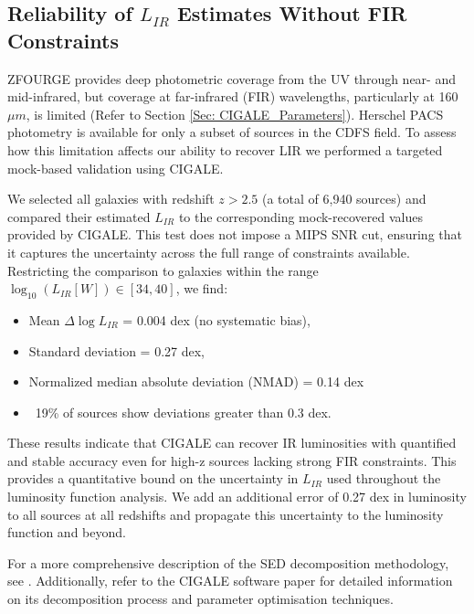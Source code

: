 \subsection{Reliability of $L_{IR}$ Estimates Without FIR Constraints} \label{Sec: FIR Constraints}
ZFOURGE provides deep photometric coverage from the UV through near- and mid-infrared, but coverage at far-infrared (FIR) wavelengths, particularly at 160$\mu m$, is limited (Refer to Section \ref{Sec: CIGALE_Parameters}). Herschel PACS photometry is available for only a subset of sources in the CDFS field. To assess how this limitation affects our ability to recover LIR we performed a targeted mock-based validation using CIGALE.

We selected all galaxies with redshift $z > 2.5$ (a total of 6,940 sources) and compared their estimated $L_{IR}$ to the corresponding mock-recovered values provided by CIGALE. This test does not impose a MIPS SNR cut, ensuring that it captures the uncertainty across the full range of constraints available. Restricting the comparison to galaxies within the range $\log_{10}(L_{IR} [W]) \in [34, 40]$, we find:

\begin{itemize}
    \item Mean $\Delta \log L_{IR}$ = 0.004 dex (no systematic bias),
    \item Standard deviation = 0.27 dex,
    \item Normalized median absolute deviation (NMAD) = 0.14 dex
    \item ~19\% of sources show deviations greater than 0.3 dex.
\end{itemize}

These results indicate that CIGALE can recover IR luminosities with quantified and stable accuracy even for high-z sources lacking strong FIR constraints. This provides a quantitative bound on the uncertainty in $L_{IR}$ used throughout the luminosity function analysis. We add an additional error of 0.27 dex in luminosity to all sources at all redshifts and propagate this uncertainty to the luminosity function and beyond.

For a more comprehensive description of the SED decomposition methodology, see \cite{cowley_decoupled_2018}. Additionally, refer to the CIGALE software paper \citep{boquien_cigale_2019} for detailed information on its decomposition process and parameter optimisation techniques.


